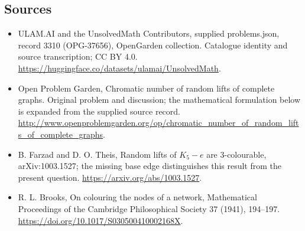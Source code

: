 \documentclass[11pt,a4paper]{article}
\begin{document}
\subsection{Sources}
\begin{itemize}
\item[S1] ULAM.AI and the UnsolvedMath Contributors, supplied problems.json, record 3310 (OPG-37656), OpenGarden collection. Catalogue identity and source transcription; CC BY 4.0.
\url{https://huggingface.co/datasets/ulamai/UnsolvedMath}.
\item[S2] Open Problem Garden, Chromatic number of random lifts of complete graphs. Original problem and discussion; the mathematical formulation below is expanded from the supplied source record.
\url{http://www.openproblemgarden.org/op/chromatic_number_of_random_lifts_of_complete_graphs}.
\item[S3] B. Farzad and D. O. Theis, Random lifts of $K_5-e$ are 3-colourable, arXiv:1003.1527; the missing base edge distinguishes this result from the present question.
\url{https://arxiv.org/abs/1003.1527}.
\item[S4] R. L. Brooks, On colouring the nodes of a network, Mathematical Proceedings of the Cambridge Philosophical Society 37 (1941), 194--197.
\url{https://doi.org/10.1017/S030500410002168X}.
\end{itemize}
\end{document}

